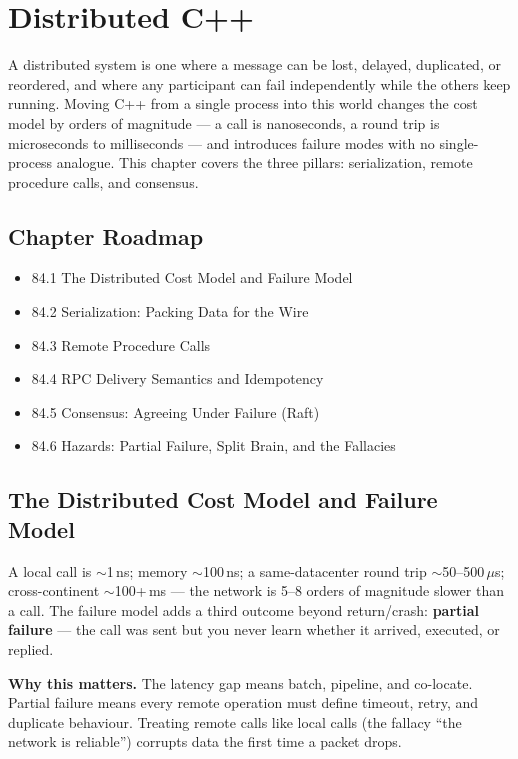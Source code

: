 \chapter{Distributed C++}

A distributed system is one where a message can be lost, delayed, duplicated, or reordered, and where any participant can fail independently while the others keep running. Moving C++ from a single process into this world changes the cost model by orders of magnitude --- a call is nanoseconds, a round trip is microseconds to milliseconds --- and introduces failure modes with no single-process analogue. This chapter covers the three pillars: serialization, remote procedure calls, and consensus.

\section*{Chapter Roadmap}
\begin{itemize}
\item 84.1 The Distributed Cost Model and Failure Model
\item 84.2 Serialization: Packing Data for the Wire
\item 84.3 Remote Procedure Calls
\item 84.4 RPC Delivery Semantics and Idempotency
\item 84.5 Consensus: Agreeing Under Failure (Raft)
\item 84.6 Hazards: Partial Failure, Split Brain, and the Fallacies
\end{itemize}

\section{The Distributed Cost Model and Failure Model}
A local call is $\sim$1\,ns; memory $\sim$100\,ns; a same-datacenter round trip $\sim$50--500\,$\mu$s; cross-continent $\sim$100+\,ms --- the network is 5--8 orders of magnitude slower than a call. The failure model adds a third outcome beyond return/crash: \textbf{partial failure} --- the call was sent but you never learn whether it arrived, executed, or replied.

\textbf{Why this matters.} The latency gap means batch, pipeline, and co-locate. Partial failure means every remote operation must define timeout, retry, and duplicate behaviour. Treating remote calls like local calls (the fallacy ``the network is reliable'') corrupts data the first time a packet drops.

